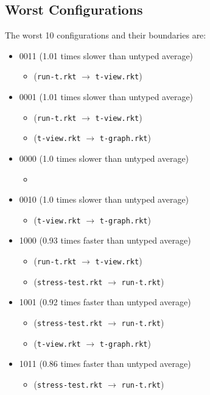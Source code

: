 \documentclass{article}
\newcommand{\mono}[1]{\texttt{#1}}
\begin{document}
\subsection{Worst Configurations}
The worst 10 configurations and their boundaries are:
\begin{itemize}
\item 0011 (1.01 times slower than untyped average)
  \begin{itemize}
  \item (\mono{run-t.rkt} $\rightarrow$ \mono{t-view.rkt})
  \end{itemize}
\item 0001 (1.01 times slower than untyped average)
  \begin{itemize}
  \item (\mono{run-t.rkt} $\rightarrow$ \mono{t-view.rkt})
  \item (\mono{t-view.rkt} $\rightarrow$ \mono{t-graph.rkt})
  \end{itemize}
\item 0000 (1.0 times slower than untyped average)
  \begin{itemize}
  \item 
  \end{itemize}
\item 0010 (1.0 times slower than untyped average)
  \begin{itemize}
  \item (\mono{t-view.rkt} $\rightarrow$ \mono{t-graph.rkt})
  \end{itemize}
\item 1000 (0.93 times faster than untyped average)
  \begin{itemize}
  \item (\mono{run-t.rkt} $\rightarrow$ \mono{t-view.rkt})
  \item (\mono{stress-test.rkt} $\rightarrow$ \mono{run-t.rkt})
  \end{itemize}
\item 1001 (0.92 times faster than untyped average)
  \begin{itemize}
  \item (\mono{stress-test.rkt} $\rightarrow$ \mono{run-t.rkt})
  \item (\mono{t-view.rkt} $\rightarrow$ \mono{t-graph.rkt})
  \end{itemize}
\item 1011 (0.86 times faster than untyped average)
  \begin{itemize}
  \item (\mono{stress-test.rkt} $\rightarrow$ \mono{run-t.rkt})

\end{itemize}
\end{itemize}
\end{document}
